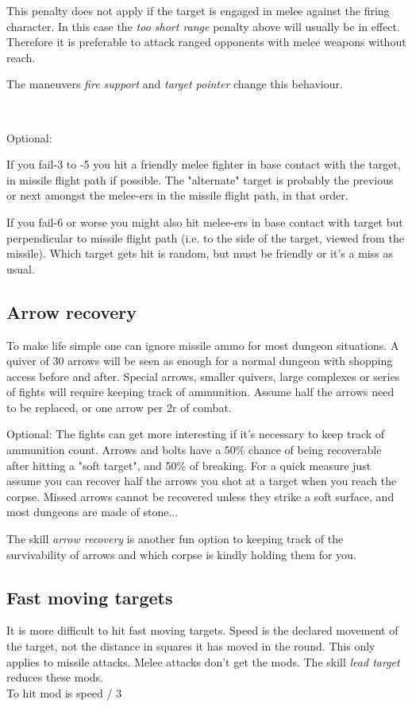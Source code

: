 This penalty does not apply if the target is engaged in melee against the firing character. In this case the \emph{too short range} penalty above will usually be in effect. Therefore it is preferable to attack ranged opponents with melee weapons without reach.

The maneuvers \emph{fire support} and \emph{target pointer} change this behaviour.

\

\noindent Optional:

If you fail-3 to -5 you hit a friendly melee fighter in base contact with the target, in missile flight path if possible. The "alternate" target is probably the previous or next amongst the melee-ers in the missile flight path, in that order.

If you fail-6 or worse you might also hit melee-ers in base contact with target but perpendicular to missile flight path (i.e. to the side of the target, viewed from the missile). Which target gets hit is random, but must be friendly or it's a miss as usual.



\subsection*{Arrow recovery}
To make life simple one can ignore missile ammo for most dungeon situations. A quiver of 30 arrows will be seen as enough for a normal dungeon with shopping access before and after. Special arrows, smaller quivers, large complexes or series of fights will require keeping track of ammunition. Assume half the arrows need to be replaced, or one arrow per 2r of combat.

Optional: The fights can get more interesting if it's necessary to keep track of ammunition count.
Arrows and bolts have a 50\% chance of being recoverable after hitting a "soft target", and 50\% of breaking. For a quick measure just assume you can recover half the arrows you shot at a target when you reach the corpse.
Missed arrows cannot be recovered unless they strike a soft surface, and most dungeons are made of stone...

The skill \emph{arrow recovery} is another fun option to keeping track of the survivability of arrows and which corpse is kindly holding them for you.


\subsection*{Fast moving targets}
It is more difficult to hit fast moving targets. Speed is the declared movement of the target, not the distance in squares it has moved in the round. This only applies to missile attacks. Melee attacks don't get the mods. The skill \emph{lead target} reduces these mods. \\
To hit mod is speed / 3

